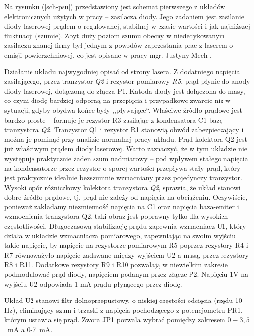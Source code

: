 \documentclass[a4paper,10pt]{article}
\begin{document}
Na rysunku (\ref{sch-psu}) przedstawiony jest schemat pierwszego z układów elektronicznych użytych w pracy -- zasilacza diody. Jego zadaniem jest zasilanie diody laserowej prądem o regulowanej, stabilnej w czasie wartości i jak najniższej fluktuacji (szumie). Zbyt duży poziom szumu obecny w niededykowanym zasilaczu znanej firmy był jednym z powodów zaprzestania prac z laserem o emisji powierzchniowej, co jest opisane w pracy mgr. Justyny Mech \cite{mgrJustynaMech}.

Działanie układu najwygodniej opisać od strony lasera. Z dodatniego napięcia zasilającego, przez tranzystor \textit{Q2} i rezystor pomiarowy \textit{R5}, prąd płynie do anody diody laserowej, dołączoną do złącza P1. Katoda diody jest dołączona do masy, co czyni diodę bardziej odporną na przepięcia i przypadkowe zwarcie niż w sytuacji, gdyby obydwa końce były ,,pływające``.  
Właściwe źródło prądowe jest bardzo proste -- formuje je rezystor R3 zasilając z kondensatora C1 bazę tranzystora \textit{Q2}. Tranzystor Q1 i rezystor R1 stanowią obwód zabezpieczający i można je pominąć przy analizie normalnej pracy układu. Prąd kolektora Q2 jest już właściwym prądem diody laserowej. Warto zaznaczyć, że w tym układzie nie występuje praktycznie żaden szum nadmiarowy -- pod wpływem stałego napięcia na kondensatorze przez rezystor o sporej wartości przepływa stały prąd, który jest praktycznie idealnie bezszumnie wzmacniany przez pojedynczy tranzystor. Wysoki opór różniczkowy kolektora tranzystora \textit{Q2}, sprawia, że układ stanowi dobre źródło prądowe, tj. prąd nie zależy od napięcia na obciążeniu. Oczywiście, ponieważ zakładamy niezmienność napięcia na C1 oraz napięcia baza-emiter i wzmocnienia tranzystora Q2, taki obraz jest poprawny tylko dla wysokich częstotliwości. Długoczasową stabilizację prądu zapewnia wzmacniacz U1, który działa w układzie wzmacniacza pomiarowego, zapewniając na swoim wyjściu takie napięcie, by napięcie na rezystorze pomiarowym R5 poprzez rezystory R4 i R7 równoważyło napięcie zadawane między wyjściem U2 a masą, przez rezystory  R8 i R11.
Dodatkowe rezystory R9 i R10 pozwalają w niewielkim zakresie podmodulować prąd diody, napięciem podanym przez złącze P2.
Napięciu 1V na wyjściu U2 odpowiada 1 mA prądu płynącego przez diodę.

Układ U2 stanowi filtr dolnoprzepustowy, o niskiej częstości odcięcia (rzędu 10 Hz), eliminujący szum i trzaski z napięcia pochodzącego z potencjometru PR1, którym ustawia się prąd. Zwora JP1 pozwala wybrać pomiędzy zakresem $0-3{,}5$~mA a 0-7~mA.
\end{document}
